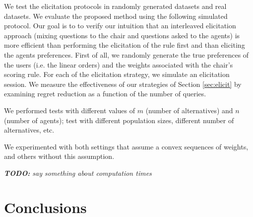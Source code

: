 We test the elicitation protocols in randomly generated datasets and real datasets. %
We evaluate the proposed method using the following simulated protocol.
Our goal is to 
 to verify our intuition that an interleaved elicitation approach (mixing questions to the chair and questions asked to the agents) is more efficient than performing the elicitation of the rule first and than eliciting the agents preferences.
First of all, we randomly generate the true preferences of the users (i.e. the linear orders) and the weights associated with the chair's scoring rule.
For each of the elicitation strategy, we simulate an elicitation session.
We measure the effectiveness of our strategies of Section \ref{sec:elicit} by examining regret reduction as a function of the number of queries.

We performed tests with different values of $m$ (number of alternatives) and $n$ (number of agents); test with different population sizes, different number of alternatives, etc.

We experimented with both settings that assume a convex sequences of weights, and others without this assumption.

{\em {\bf TODO:} say something about computation times}


\section{Conclusions}  \label{sec:conclusions}

